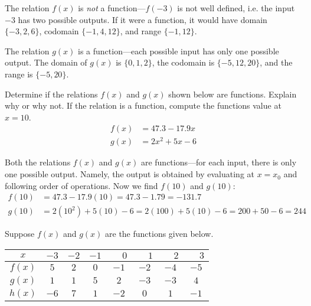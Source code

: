 \documentclass[11pt,letterpaper]{article}
\begin{document}
\sol The relation $f(x)$ is \textit{not} a function---$f(-3)$ is not well defined, i.e. the input $-3$ has two possible outputs. If it were a function, it would have domain $\{ -3, 2, 6 \}$, codomain $\{-1, 4, 12 \}$, and range $\{ -1, 12 \}$. \pspace

The relation $g(x)$ is a function---each possible input has only one possible output. The domain of $g(x)$ is $\{ 0, 1, 2 \}$, the codomain is $\{ -5, 12, 20 \}$, and the range is $\{ -5, 20 \}$. 



\newpage



 Determine if the relations $f(x)$ and $g(x)$ shown below are functions. Explain why or why not. If the relation is a function, compute the functions value at $x= 10$. 
	\[
	\begin{aligned}
	f(x)&= 47.3 - 17.9x \\[0.3cm]
	g(x)&= 2x^2 + 5x - 6
	\end{aligned}
	\] \pspace

\sol Both the relations $f(x)$ and $g(x)$ are functions---for each input, there is only one possible output. Namely, the output is obtained by evaluating at $x= x_0$ and following order of operations. Now we find $f(10)$ and $g(10)$: \pspace
	\[
	\begin{aligned}
	f(10)&= 47.3 - 17.9(10)= 47.3 - 1.79= -131.7 \\[0.3cm]
	g(10)&= 2(10^2) + 5(10) - 6= 2(100) + 5(10) - 6= 200 + 50 - 6= 244
	\end{aligned}
	\]



\newpage



 Suppose $f(x)$ and $g(x)$ are the functions given below. 
        \begin{table}[!ht]
        \centering
        \begin{tabular}{| c || c | c | c | c | c | c | c |} \hline
	$x$ & $-3$ & $-2$ & $-1$ & $\phantom{-}0$ & $\phantom{-}1$ & $\phantom{-}2$ & $\phantom{-}3$ \\ \hline
	$f(x)$ & $5$ & $2$ & $0$ & $-1$ & $-2$ & $-4$ & $-5$ \\ \hline
	$g(x)$ & $1$ & $1$ & $5$ & $2$ & $-3$ & $-3$ & $4$ \\ \hline
	$h(x)$ & $-6$ & $7$ & $1$ & $-2$ & $0$ & $1$ & $-1$ \\ \hline
        \end{tabular}
        \end{table}
\end{document}
